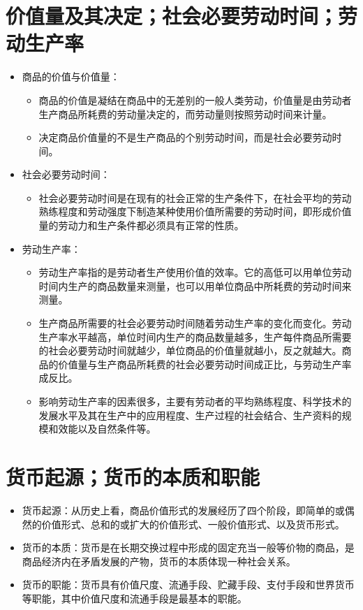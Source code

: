 \documentclass[12pt,openany]{ctexbook}
\begin{document}
\section{价值量及其决定；社会必要劳动时间；劳动生产率}
\begin{itemize}
  \item 商品的价值与价值量：
\begin{itemize}
  \item 商品的价值是凝结在商品中的无差别的一般人类劳动，价值量是由劳动者生产商品所耗费的劳动量决定的，而劳动量则按照劳动时间来计量。
  \item 决定商品价值量的不是生产商品的个别劳动时间，而是社会必要劳动时间。
\end{itemize}
  \item 社会必要劳动时间：
\begin{itemize}
  \item 社会必要劳动时间是在现有的社会正常的生产条件下，在社会平均的劳动熟练程度和劳动强度下制造某种使用价值所需要的劳动时间，即形成价值量的劳动力和生产条件都必须具有正常的性质。
\end{itemize}
  \item 劳动生产率：
\begin{itemize}
  \item 劳动生产率指的是劳动者生产使用价值的效率。它的高低可以用单位劳动时间内生产的商品数量来测量，也可以用单位商品中所耗费的劳动时间来测量。
  \item 生产商品所需要的社会必要劳动时间随着劳动生产率的变化而变化。劳动生产率水平越高，单位时间内生产的商品数量越多，生产每件商品所需要的社会必要劳动时间就越少，单位商品的价值量就越小，反之就越大。商品的价值量与生产商品所耗费的社会必要劳动时间成正比，与劳动生产率成反比。
  \item 影响劳动生产率的因素很多，主要有劳动者的平均熟练程度、科学技术的发展水平及其在生产中的应用程度、生产过程的社会结合、生产资料的规模和效能以及自然条件等。
\end{itemize}
\end{itemize}
\section{货币起源；货币的本质和职能}
\begin{itemize}
  \item 货币起源：从历史上看，商品价值形式的发展经历了四个阶段，即简单的或偶然的价值形式、总和的或扩大的价值形式、一般价值形式、以及货币形式。
  \item 货币的本质：货币是在长期交换过程中形成的固定充当一般等价物的商品，是商品经济内在矛盾发展的产物，货币的本质体现一种社会关系。
  \item 货币的职能：货币具有价值尺度、流通手段、贮藏手段、支付手段和世界货币等职能，其中价值尺度和流通手段是最基本的职能。
\end{itemize}
\end{document}
